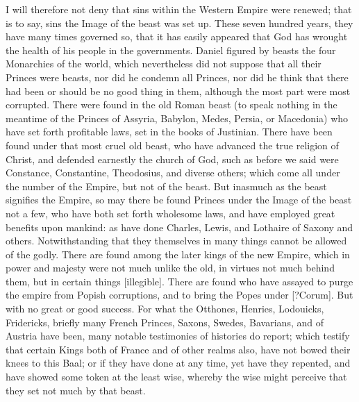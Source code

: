 I will therefore not deny that sins within the Western Empire were renewed; that is to say, sins the Image of the beast was set up. These seven hundred years, they have many times governed so, that it has easily appeared that God has wrought the health of his people in the governments. Daniel figured by beasts the four Monarchies of the world, which nevertheless did not suppose that all their Princes were beasts, nor did he condemn all Princes, nor did he think that there had been or should be no good thing in them, although the most part were most corrupted. There were found in the old Roman beast (to speak nothing in the meantime of the Princes of Assyria, Babylon, Medes, Persia, or Macedonia) who have set forth profitable laws, set in the books of Justinian. There have been found under that most cruel old beast, who have advanced the true religion of Christ, and defended earnestly the church of God, such as before we said were Constance, Constantine, Theodosius, and diverse others; which come all under the number of the Empire, but not of the beast. But inasmuch as the beast signifies the Empire, so may there be found Princes under the Image of the beast not a few, who have both set forth wholesome laws, and have employed great benefits upon mankind: as have done Charles, Lewis, and Lothaire of Saxony and others. Notwithstanding that they themselves in many things cannot be allowed of the godly. There are found among the later kings of the new Empire, which in power and majesty were not much unlike the old, in virtues not much behind them, but in certain things [illegible]. There are found who have assayed to purge the empire from Popish corruptions, and to bring the Popes under [?Corum]. But with no great or good success. For what the Otthones, Henries, Lodouicks, Fridericks, briefly many French Princes, Saxons, Swedes, Bavarians, and of Austria have been, many notable testimonies of histories do report; which testify that certain Kings both of France and of other realms also, have not bowed their knees to this Baal; or if they have done at any time, yet have they repented, and have showed some token at the least wise, whereby the wise might perceive that they set not much by that beast.

